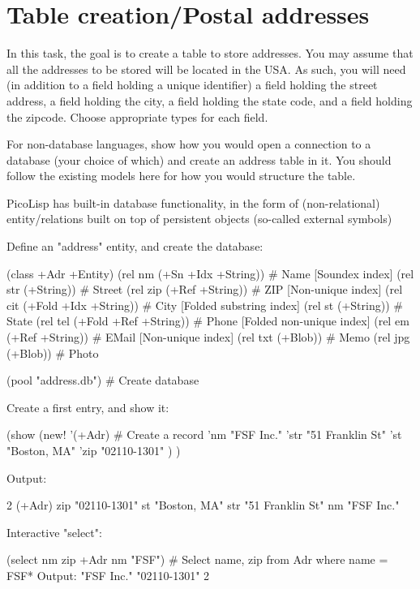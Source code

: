 \pagebreak{}
\section*{Table creation/Postal addresses}

In this task, the goal is to create a table to store addresses. You may
assume that all the addresses to be stored will be located in the USA.
As such, you will need (in addition to a field holding a unique
identifier) a field holding the street address, a field holding the
city, a field holding the state code, and a field holding the zipcode.
Choose appropriate types for each field.

For non-database languages, show how you would open a connection to a
database (your choice of which) and create an address table in it. You
should follow the existing models here for how you would structure the
table.


\begin{wideverbatim}

PicoLisp has built-in database functionality, in the form of (non-relational)
entity/relations built on top of persistent objects (so-called external symbols)

Define an "address" entity, and create the database:

(class +Adr +Entity)
(rel nm (+Sn +Idx +String))            # Name [Soundex index]
(rel str (+String))                    # Street
(rel zip (+Ref +String))               # ZIP [Non-unique index]
(rel cit (+Fold +Idx +String))         # City [Folded substring index]
(rel st (+String))                     # State
(rel tel (+Fold +Ref +String))         # Phone [Folded non-unique index]
(rel em (+Ref +String))                # EMail [Non-unique index]
(rel txt (+Blob))                      # Memo
(rel jpg (+Blob))                      # Photo

(pool "address.db")  # Create database

Create a first entry, and show it:

(show
   (new! '(+Adr)  # Create a record
      'nm "FSF Inc."
      'str "51 Franklin St"
      'st "Boston, MA"
      'zip "02110-1301" ) )

Output:

{2} (+Adr)
   zip "02110-1301"
   st "Boston, MA"
   str "51 Franklin St"
   nm "FSF Inc."

Interactive "select":

(select nm zip +Adr nm "FSF")  # Select name, zip from Adr where name = FSF*
Output:
"FSF Inc." "02110-1301" {2}

\end{wideverbatim}


